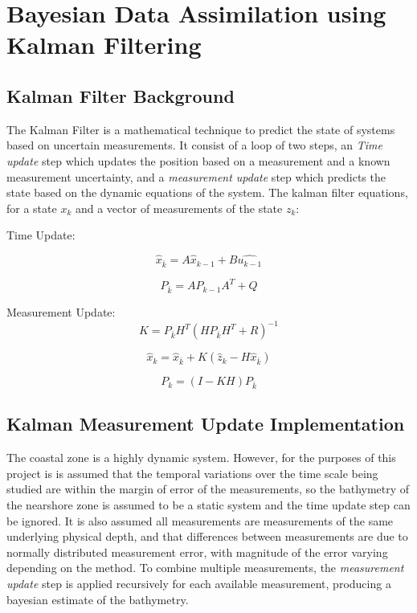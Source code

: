 \section{Bayesian Data Assimilation using Kalman Filtering}
\subsection{Kalman Filter Background}
The Kalman Filter is a mathematical technique to predict the state of systems based on uncertain measurements. It consist of a loop of two steps, an \emph{Time update} step which updates the position based on a measurement and a known measurement uncertainty, and a \emph{measurement update} step which predicts the state based on the dynamic equations of the system. The kalman filter equations, for a state $x_k$ and a vector of measurements of the state $z_k$:

Time Update:

\begin{equation}
    \hat{x}_{\bar{k}} = A\hat{x}_{k-1} + B\hat{u_{k-1}}
\end{equation}

\begin{equation}
    P_{\bar{k}} = A P_{k-1} A^T + Q
\end{equation}

Measurement Update:
\begin{equation}
    K = P_{\bar{k}} H^T(H P_{\bar{k}} H^T + R) ^{-1}
\end{equation}

\begin{equation}
    \hat{x}_k = \hat{x}_{\bar{k}} + K(\hat{z}_k - H \hat{x}_{\bar{k}})
\end{equation}

\begin{equation}
    P_k = (I - KH)P_{\bar{k}}
\end{equation}


\subsection{Kalman Measurement Update Implementation}
The coastal zone is a highly dynamic system. However, for the purposes of this project is is assumed that the temporal variations over the time scale being studied are within the margin of error of the measurements, so the bathymetry of the nearshore zone is assumed to be a static system and the time update step can be ignored. It is also assumed all measurements are measurements of the same underlying physical depth, and that differences between measurements are due to normally distributed measurement error, with magnitude of the error varying depending on the method. To combine multiple measurements, the \emph{measurement update} step is applied recursively for each available measurement, producing a bayesian estimate of the bathymetry.  

